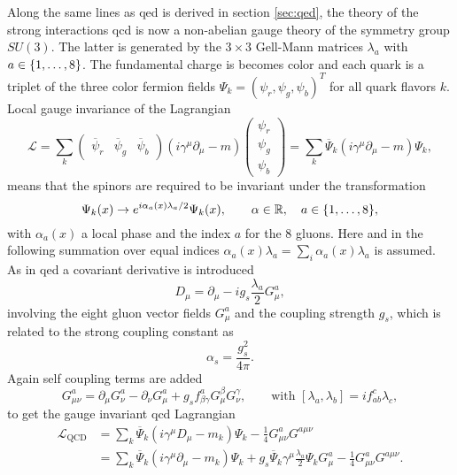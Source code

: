Along the same lines as \ac{qed} is derived in section \ref{sec:qed}, the theory of the strong interactions \ac{qcd} is now a non-abelian gauge theory of the symmetry group $SU(3)$. The latter is generated by the $3\times 3$ Gell-Mann matrices $\lambda_a$ with $ a\in\{1,\mathellipsis,8\}$. The fundamental charge is becomes color and each quark is a triplet of the three color fermion fields $\Psi_k=(\psi_r,\psi_g,\psi_b)^T$ for all quark flavors $k$. Local gauge invariance of the Lagrangian
\begin{equation}
    \mathcal{L} =
    \sum_k
    \begin{pmatrix}
        \overline{\psi}_r & \overline{\psi}_g & \overline{\psi}_b
    \end{pmatrix}
    (i \gamma^\mu \partial_\mu - m )
    \begin{pmatrix}
        \psi_r \\
        \psi_g \\
        \psi_b
    \end{pmatrix}
    =
    \sum_k
    \overline{\Psi}_k(i \gamma^\mu \partial_\mu - m )\Psi_k,
    \label{eq:dirac}
\end{equation}
means that the spinors are required to be invariant under the transformation
\begin{equation}
    \Psi_k(x) \rightarrow e^{i \alpha_a(x) \lambda_a/2} \Psi_k(x),\qquad \alpha\in\mathbb{R},\quad a\in\{1,\mathellipsis,8\},
\end{equation}
with $\alpha_a(x)$ a local phase and the index $a$ for the 8 gluons. Here and in the following  summation over equal indices $\alpha_a(x) \lambda_a=\sum_i \alpha_a(x) \lambda_a$ is assumed. As in \ac{qed} a covariant derivative is introduced
\begin{equation}
    D_\mu = \partial_\mu - i g_s \frac{\lambda_a}{2}G_\mu^a,
\end{equation}
involving the eight gluon vector fields $G_\mu^a$ and the coupling strength $g_s$, which is related to the strong coupling constant as
\begin{equation}
    \alpha_s=\frac{g_s^2}{4\pi}.
\end{equation}
Again self coupling terms are added
\begin{equation}
    G^a_{\mu\nu}=\partial_\mu G_\nu^a-\partial_\nu G_\mu^a+g_s f^a_{\beta\gamma}G^\beta_\mu G_\nu^\gamma, \qquad \text{with } [\lambda_a,\lambda_b]= i f_{ab}^c \lambda_c,
\end{equation}
to get the gauge invariant \ac{qcd} Lagrangian
\begin{align}
    {\mathcal {L}}_{\text{QCD}} & =\sum_k\overline{\Psi}_k\left( i \gamma^\mu D_\mu-m_k\right)\Psi_k-{\frac {1}{4}}G_{\mu \nu }^{a}G^{a\mu \nu}                                                                                    \\
                                & =\sum_k{\overline{\Psi}_k}\left(i\gamma^\mu \partial_\mu-m_k\right)\Psi_k+ g_s{\overline{\Psi}_k}\gamma ^{\mu }\frac{ \lambda_a}{2} \Psi_k G_\mu^a - {\frac {1}{4}}G_{\mu \nu }^{a}G^{a\mu \nu}.
    \label{eq:l_qcd}
\end{align}
